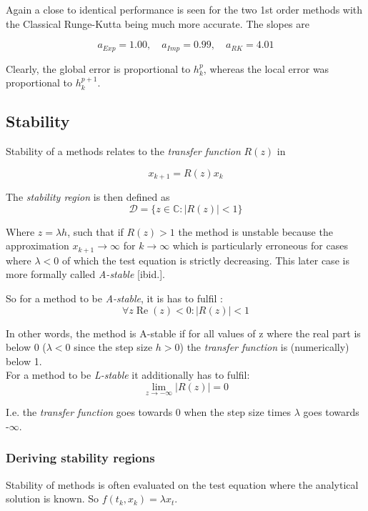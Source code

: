 Again a close to identical performance is seen for the two 1st order methods with the Classical Runge-Kutta being much more accurate. The slopes are

$$
a_{Exp} = 1.00, \quad a_{Imp} = 0.99, \quad a_{RK} = 4.01
$$

Clearly, the global error is proportional to $h_{k}^{p}$, whereas the local error was proportional to $h_{k}^{p+1}$.

\subsection{Stability}
Stability of a methods relates to the \textit{transfer function} $R(z)$ in

\begin{equation}
    x_{k+1}=R(z) x_{k}
\end{equation}

The \textit{stability region} is then defined as \cite{JrgensenScientificEquationsc}
$$ \mathcal{D}=\{z \in \mathbb{C}:|R(z)|<1\} $$

Where $z = \lambda h$, such that if $R(z) > 1$ the method is unstable because the approximation $x_{k+1} \to \infty$ for $k \to \infty$ which is particularly erroneous for cases where $\lambda < 0$ of which the test equation is strictly decreasing. This later case is more formally called \textit{A-stable} [ibid.].

So for a method to be\textit{ A-stable}, it is has to fulfil \cite{JrgensenRunge-KuttaControl}:
\begin{equation}
    \forall z \operatorname{Re}(z)<0  :   |R(z)|<1
\end{equation}

In other words, the method is A-stable if for all values of z where the real part is below 0 (\iff $\lambda < 0$ since the step size $h > 0$) the \textit{transfer function} is (numerically) below 1.
\\

For a method to be \textit{L-stable} it additionally has to fulfil:
\begin{equation}
\lim _{z \rightarrow-\infty}|R(z)|=0
\end{equation}

I.e. the \textit{transfer function} goes towards 0 when the step size times $\lambda$ goes towards -$\infty$.

\subsubsection*{Deriving stability regions}
Stability of methods is often evaluated on the test equation where the analytical solution is known. So $f(t_k, x_k) = \lambda x_t$.\\

